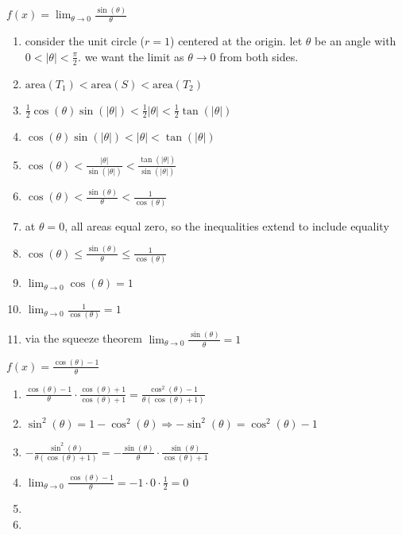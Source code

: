 \documentclass{article}
\begin{document}
\textbf{$f(x) = \lim_{\theta \to 0}\frac{\sin(\theta)}{\theta}$}
	\begin{enumerate}
		\item consider the unit circle ($r = 1$) centered at the origin. let $\theta$ be an angle with $0 < \lvert \theta \rvert < \frac{\pi}{2}$. we want the limit as $\theta \to 0$ from both sides.
		\item $\text{area}(T_1) < \text{area}(S) < \text{area}(T_2)$
		\item $\frac{1}{2}\cos(\theta)\sin(\lvert\theta\rvert) < \frac{1}{2}\lvert\theta\rvert < \frac{1}{2}\tan(\lvert\theta\rvert)$
		\item $\cos(\theta)\sin(\lvert\theta\rvert) < \lvert\theta\rvert < \tan(\lvert\theta\rvert)$ 
		\item $\cos(\theta) < \frac{\lvert\theta\rvert}{\sin(\lvert\theta\rvert)} < \frac{\tan(\lvert\theta\rvert)}{\sin(\lvert\theta\rvert)}$
		\item $\cos(\theta) < \frac{\sin(\theta)}{\theta} < \frac{1}{\cos(\theta)}$
		\item at $\theta = 0$, all areas equal zero, so the inequalities extend to include equality
		\item $\cos(\theta) \leq \frac{\sin(\theta)}{\theta} \leq \frac{1}{\cos(\theta)}$ 
		\item $\lim_{\theta \to 0}\cos(\theta) = 1$
		\item $\lim_{\theta \to 0}\frac{1}{\cos(\theta)} = 1$
		\item via the squeeze theorem $\lim_{\theta \to 0}\frac{\sin(\theta)}{\theta} = 1$
	\end{enumerate}

\textbf{$f(x) = \frac{\cos(\theta) - 1}{\theta}$}
	\begin{enumerate}
		\item $\frac{\cos(\theta) - 1}{\theta} \cdot \frac{\cos(\theta) + 1}{\cos(\theta) + 1} = \frac{\cos^2(\theta) - 1}{\theta(\cos(\theta) + 1)}$
		\item $\sin^2(\theta) = 1 - \cos^2(\theta) \Rightarrow -\sin^2(\theta) = \cos^2(\theta) - 1$
		\item $-\frac{\sin^2(\theta)}{\theta(\cos(\theta) + 1)} = -\frac{\sin(\theta)}{\theta} \cdot \frac{\sin(\theta)}{\cos(\theta) + 1}$
		\item $\lim_{\theta \to 0}\frac{\cos(\theta) - 1}{\theta} = -1 \cdot 0 \cdot \frac{1}{2} = 0$
		\item
		\item
	\end{enumerate}
\end{document}
